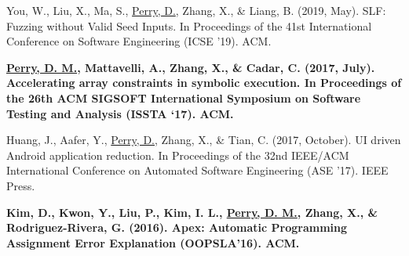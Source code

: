 \documentclass[]{deedy-resume-openfont}
\begin{document}
\begin{minipage}[t]{0.66\textwidth}
\vspace{.05in}

You, W., Liu, X., Ma, S., \underline{Perry, D.}, Zhang, X., \& Liang, B. (2019,
May). SLF: Fuzzing without Valid Seed Inputs. In
Proceedings of the 41st International Conference on Software Engineering (ICSE '19). ACM.

\vspace{.05in}

{\fontsize{10pt}{12pt}\selectfont\bfseries \underline{Perry, D. M.}, Mattavelli, A., Zhang, X., \& Cadar, C. (2017, July). Accelerating array constraints in symbolic execution. In Proceedings of the 26th ACM SIGSOFT International Symposium on Software Testing and Analysis (ISSTA `17). ACM. }
\vspace{.05in}

Huang, J., Aafer, Y., \underline{Perry, D.}, Zhang, X., \& Tian, C. (2017, October). UI driven Android application reduction. In Proceedings of the 32nd IEEE/ACM International Conference on Automated Software Engineering (ASE '17). IEEE Press.

\vspace{.05in}
{\fontsize{10pt}{12pt}\selectfont\bfseries Kim, D., Kwon, Y., Liu, P., Kim, I. L., \underline{Perry, D. M.}, Zhang, X., \& Rodriguez-Rivera, G. (2016). Apex: Automatic Programming Assignment Error Explanation (OOPSLA’16). ACM.}

%
\sectionsep



\end{minipage}
\end{document}
